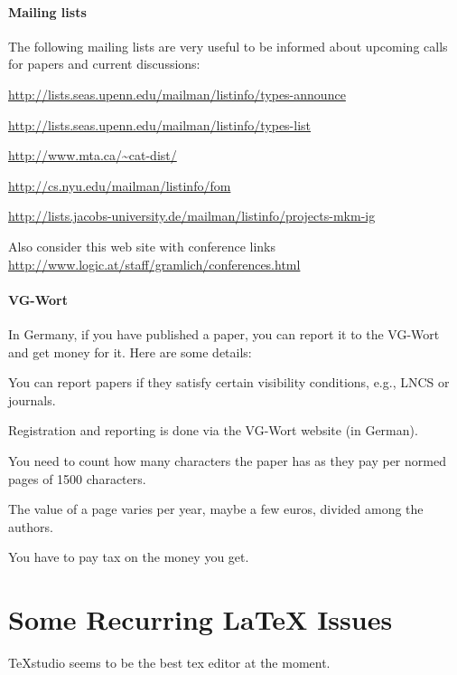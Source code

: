 \documentclass[12pt]{article}
\begin{document}
\paragraph{Mailing lists}
The following mailing lists are very useful to be informed about upcoming calls for papers and current discussions:
\begin{compactitem}
\item \url{http://lists.seas.upenn.edu/mailman/listinfo/types-announce}
\item \url{http://lists.seas.upenn.edu/mailman/listinfo/types-list}
\item \url{http://www.mta.ca/~cat-dist/}
\item \url{http://cs.nyu.edu/mailman/listinfo/fom}
\item \url{http://lists.jacobs-university.de/mailman/listinfo/projects-mkm-ig}
\end{compactitem}

Also consider this web site with conference links
\url{http://www.logic.at/staff/gramlich/conferences.html}

\paragraph{VG-Wort}
In Germany, if you have published a paper, you can report it to the VG-Wort and get money for it. Here are some details:
\begin{compactitem}
\item You can report papers if they satisfy certain visibility conditions, e.g., LNCS or journals.
\item Registration and reporting is done via the VG-Wort website (in German).
\item You need to count how many characters the paper has as they pay per normed pages of 1500 characters.
\item The value of a page varies per year, maybe a few euros, divided among the authors.
\item You have to pay tax on the money you get.
\end{compactitem}

\section{Some Recurring LaTeX Issues}

TeXstudio seems to be the best tex editor at the moment.
\medskip
\end{document}
